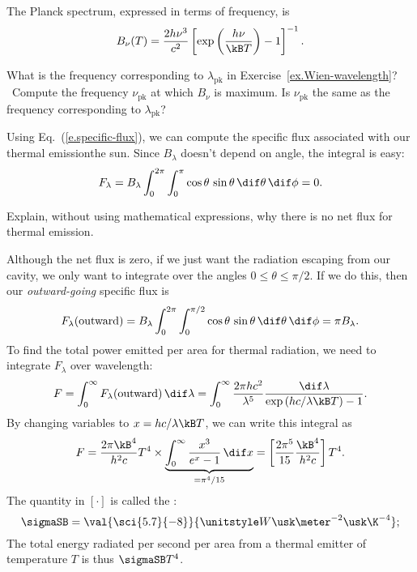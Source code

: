 The Planck spectrum, expressed in terms of frequency, is
\begin{equation}\label{e.planck-spectrum-frequency}
B_{\nu}(T) = \frac{2h\nu^{3}}{c^{2}} \left[\exp\left(\frac{h\nu}{\kB T}\right)-1\right]^{-1}.
\end{equation}

\begin{exercisebox}
What is the frequency corresponding to $\lambda_{\mathrm{pk}}$ in Exercise~\ref{ex.Wien-wavelength}? \notebook~Compute the frequency $\nu_{\mathrm{pk}}$ at which $B_{\nu}$ is maximum. Is $\nu_{\mathrm{pk}}$ the same as the frequency corresponding to $\lambda_{\mathrm{pk}}$?
\end{exercisebox}

Using Eq.~(\ref{e.specific-flux}), we can compute the specific flux associated with our thermal emissionthe sun. Since $B_{\lambda}$ doesn't depend on angle, the integral is easy:
\[ F_{\lambda} = B_{\lambda}\int_{0}^{2\pi}\int_{0}^{\pi}\cos\theta\,\sin\theta\,\dif\theta\,\dif\phi = 0. \]

\begin{exercisebox}
Explain, without using mathematical expressions, why there is no net flux for thermal emission.
\end{exercisebox}

Although the net flux is zero, if we just want the radiation escaping from our cavity, we only want to integrate over the angles $0\le\theta\le\pi/2$. If we do this, then our \emph{outward-going} specific flux is
\begin{equation}\label{e.outward-thermal-flux}
 F_{\lambda}(\mathrm{outward}) = B_{\lambda}\int_{0}^{2\pi}\int_{0}^{\pi/2}\cos\theta\,\sin\theta\,\dif\theta\,\dif\phi = \pi B_{\lambda}.
\end{equation}
To find the total power emitted per area for thermal radiation, we need to integrate $F_{\lambda}$ over wavelength:
\begin{equation}\label{e.bolometric-thermal-flux}
F = \int_{0}^{\infty}F_{\lambda}(\mathrm{outward})\,\dif\lambda 
	= \int_{0}^{\infty} \frac{2\pi hc^{2}}{\lambda^{5}} \frac{\dif\lambda}{\exp\left(hc/\lambda\kB T\right)-1}.
\end{equation}
By changing variables to $x = hc/\lambda\kB T$, we can write this integral as
\[
	F = \frac{2\pi\kB^{4}}{h^{2}c}T^{4}\times \underbrace{\int_{0}^{\infty}\frac{x^{3}}{e^{x}-1}\,\dif x}_{=\pi^{4}/15} = \left[\frac{2\pi^{5}}{15}\frac{\kB^{4}}{h^{2}c}\right] T^{4}.
\]
The quantity in $\left[\cdot\right]$ is called the :
\[
	\sigmaSB = \val{\sci{5.7}{-8}}{\watt\usk\meter^{-2}\usk\K^{-4}};
\]
The total energy radiated per second per area from a thermal emitter of temperature $T$ is thus $\sigmaSB T^{4}$.

